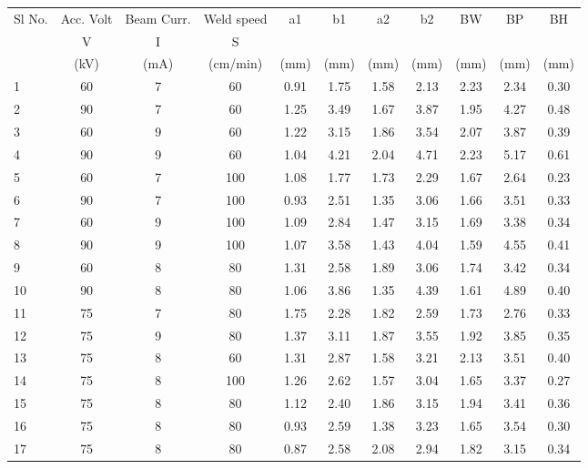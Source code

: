 \begin{landscape}
\begin{table}[h]
\begin{center} 
\vspace{-20 pt}
\begin{tabular}{l c c c c c c c c c c}
\hline
{Sl No.}&{Acc. Volt}&{Beam Curr.}&{Weld speed}&{a1}&{b1}&{a2}&{b2}&{BW}&{BP}&{BH}\\
{}&{V}&{I}&{S}&{}&{}&{}&{}&{}&{}&{}\\
{}&{(kV)}&{(mA)}&{(cm/min)}&{(mm)}&{(mm)}&{(mm)}&{(mm)}&{(mm)}&{(mm)}&{(mm)}\\\hline
{1}&{60}	&{7}	&{60}	&{0.91}	&{1.75}	&{1.58}	&{2.13}	&{2.23}	&{2.34} &{0.30}\\
{2}&{90}	&{7}	&{60}	&{1.25}	&{3.49}	&{1.67}	&{3.87}	&{1.95}	&{4.27}	&{0.48}\\
{3}&{60}	&{9}	&{60}	&{1.22}	&{3.15}	&{1.86}	&{3.54}	&{2.07}	&{3.87}	&{0.39}\\
{4}&{90}	&{9}	&{60}	&{1.04}	&{4.21}	&{2.04}	&{4.71}	&{2.23}	&{5.17}	&{0.61}\\
{5}&{60}	&{7}	&{100}	&{1.08}	&{1.77}	&{1.73}	&{2.29}	&{1.67}	&{2.64}	&{0.23}\\
{6}&{90}&	{7}	&{100}	&{0.93}&	{2.51}	&{1.35}	&{3.06}	&{1.66}&	{3.51}&	{0.33}\\
{7}&{60}	&{9}	&{100}	&{1.09}&{	2.84}&{	1.47}&{	3.15}	&{1.69}	&{3.38}	&{0.34}\\
{8}&{90}	&{9}	&{100}	&{1.07}	&{3.58}	&{1.43}	&{4.04}	&{1.59}&	{4.55}	&{0.41}\\
{9}&{60}&	{8}&	{80}&	{1.31}&	{2.58}&	{1.89}&	{3.06}&	{1.74}&	{3.42}&	{0.34}\\
{10}&{90}&	{8}&	{80}&	{1.06}&	{3.86}&	{1.35}&	{4.39}&	{1.61}&	{4.89}&	{0.40}\\
{11}&{75}&	{7}&	{80}&	{1.75}&	{2.28}&	{1.82}&	{2.59}&	{1.73}&	{2.76}&	{0.33}\\
{12}&{75}&	{9}	&{80}&	{1.37}&	{3.11}&	{1.87}&	{3.55}&	{1.92}&	{3.85}&{0.35}\\
{13}&{75}&{	8}&	{60}&	{1.31}&	{2.87}&	{1.58}&	{3.21}	&{2.13}&	{3.51}&	{0.40}\\
{14}&{75}&	{8}&	{100}&	{1.26}&	{2.62}&	{1.57}&	{3.04}	&{1.65}& 	{3.37}&	{0.27}\\
{15}&{75}&{	8}&	{80}&	{1.12}&	{2.40}&	{1.86}&	{3.15}	&{1.94}	&{3.41}&	{0.36}\\
{16}&{75}&	{8}&	{80}& {0.93}&	{2.59}	&{1.38}&	{3.23}	&{1.65}&	{3.54}&	{0.30}\\
{17}&{75}&	{8}&	{80}&	{0.87}&	{2.58}&	{2.08}&	{2.94} &	{1.82}&	{3.15}	&{0.34}\\\hline
\end{tabular}
\end{center}
\end{table}
\pagebreak
\newpage
\clearpage



\end{landscape}

